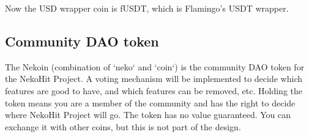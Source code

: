 Now the USD wrapper coin is fUSDT, which is Flamingo's USDT wrapper.

\subsection{Community DAO token}\label{subsec:nekoin}

The Nekoin (combination of `neko` and `coin`) is the community DAO token for
the NekoHit Project.
A voting mechanism will be implemented to decide which features are good to have,
and which features can be removed, etc.
Holding the token means you are a member of the community and has the right to
decide where NekoHit Project will go.
The token has no value guaranteed.
You can exchange it with other coins, but this is not part of the design.
